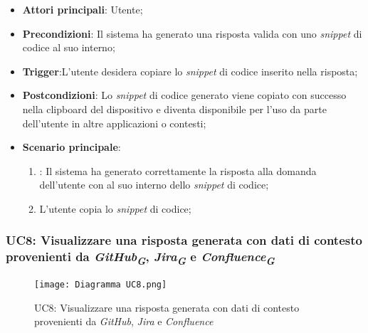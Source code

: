\begin{itemize}
    \item \textbf{Attori principali}: Utente;
    \item \textbf{Precondizioni}: Il sistema ha generato una risposta valida con uno \emph{snippet} di codice al suo interno;
    \item \textbf{Trigger}:L'utente desidera copiare lo \emph{snippet} di codice inserito nella risposta;
    \item \textbf{Postcondizioni}: Lo \emph{snippet} di codice generato viene copiato con successo nella clipboard del dispositivo e diventa disponibile per l'uso da parte dell'utente in altre applicazioni o contesti;
    \item \textbf{Scenario principale}:
    \begin{enumerate}
        \item {}: Il sistema ha generato correttamente la risposta alla domanda dell'utente con al suo interno dello \emph{snippet} di codice;
        \item L'utente copia lo \emph{snippet} di codice;
    \end{enumerate}
\end{itemize}



\newpage
\hypertarget{UC8}{}
\subsubsection{UC8: Visualizzare una risposta generata con dati di contesto provenienti da 
\emph{GitHub}\textsubscript{\textbf{\textit{G}}}, \emph{Jira}\textsubscript{\textbf{\textit{G}}} e 
\emph{Confluence}\textsubscript{\textbf{\textit{G}}}}

\begin{figure}[h]
    \centering
    \texttt{[image: Diagramma UC8.png]}
    \caption{UC8: Visualizzare una risposta generata con dati di contesto provenienti da \emph{GitHub}, \emph{Jira} e \emph{Confluence}}
\end{figure}

